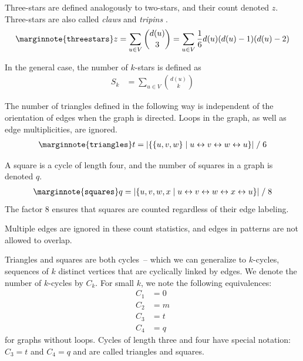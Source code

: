 \documentclass{article}
\begin{document}
Three-stars are defined analogously to two-stars, and their count
denoted $z$.  Three-stars are also called \emph{claws} and
\emph{tripins} \citep[e.g.][]{b853}.   
\begin{align}
  \marginnote{\texttt{threestars}}
  z = \sum_{u \in V} {d(u) \choose 3} = \sum_{u \in V} \frac 1 6 d(u)
  (d(u) - 1) (d(u) - 2)
\end{align}

In the general case, the number of $k$-stars is defined as
\begin{align}
  S_k &= \sum_{u \in V} {d(u) \choose k}
\end{align}

The number of
triangles defined in the following way is independent of the orientation
of edges when the graph is directed.  Loops in the graph, as well as
edge multiplicities, are ignored.
\begin{align}
  \marginnote{\texttt{triangles}}
  t = | \{ \{u, v, w\} \mid u \leftrightarrow v \leftrightarrow w \leftrightarrow u \} | \;/\; 6
\end{align}

A square is a cycle of length four, and the number of squares in a graph
is denoted $q$.
\begin{align}
  \marginnote{\texttt{squares}}
  q = | \{ u, v, w, x \mid u \leftrightarrow v \leftrightarrow w \leftrightarrow x \leftrightarrow u \} | \;/\; 8
\end{align}
The factor 8 ensures that squares are counted regardless of their edge
labeling.  

Multiple edges are ignored in these count statistics, and edges in
patterns are not allowed to overlap. 

Triangles and squares are both cycles~-- which we can generalize to
$k$-cycles, sequences of $k$ distinct vertices that are cyclically
linked by edges.  We denote the number of $k$-cycles by $C_k$. 
For small $k$, we note the following equivalences: 
\begin{align*}
  C_1 &= 0 \\
  C_2 &= m \\
  C_3 &= t \\
  C_4 &= q
\end{align*}
for graphs without loops.  Cycles of length three and four have special
notation:  $C_3 = t$ and $C_4 = q$ and are called triangles and
squares. 
\end{document}
